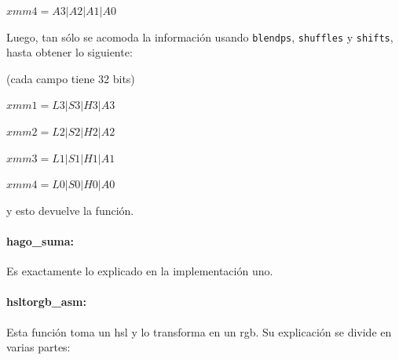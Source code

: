 \documentclass[a4paper]{article}
\begin{document}
$xmm4 = A3|A2|A1|A0$

\vspace*{0.3cm}

Luego, tan sólo se acomoda la información usando {\tt blendps}, {\tt shuffles} y {\tt shifts}, hasta obtener lo siguiente:

 \vspace*{0.3cm}

(cada campo tiene 32 bits)	
	
\vspace*{0.3cm}	

$xmm1 = L3|S3|H3|A3$

\vspace*{0.3cm}

$xmm2 = L2|S2|H2|A2$

\vspace*{0.3cm}

$xmm3 = L1|S1|H1|A1$

\vspace*{0.3cm}

$xmm4 = L0|S0|H0|A0$

\vspace*{0.3cm}

y esto devuelve la función.

\paragraph{hago_suma:}

Es exactamente lo explicado en la implementación uno.


\paragraph*{hsltorgb_asm:}

Esta función toma un hsl y lo transforma en un rgb. Su explicación se divide en varias partes:
\end{document}
